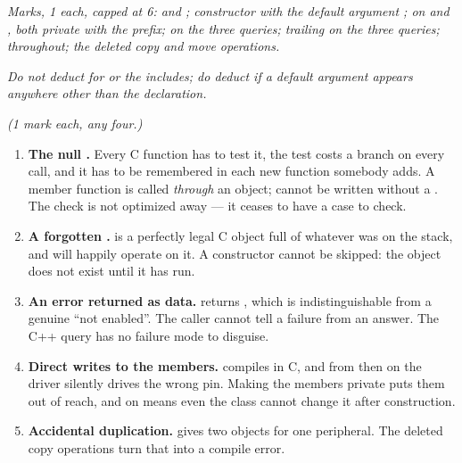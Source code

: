 {\itshape Marks, 1 each, capped at 6:  and ;
 constructor with the default argument ;  on 
and , both private with the  prefix; \code{[[nodiscard]]} on the three
queries; trailing  on the three queries;  throughout; the deleted copy
and move operations.\par}

\medskip
{\itshape Do not deduct for  or the includes; do deduct if a default argument
appears anywhere other than the declaration.\par}

{\itshape (1 mark each, any four.)\par}
\begin{enumerate}
  \item \textbf{The null .} Every C function has to test it, the test costs a branch on
    every call, and it has to be remembered in each new function somebody adds. A member function is
    called \emph{through} an object;  cannot be written without a
    . The check is not optimized away --- it ceases to have a case to check.
  \item \textbf{A forgotten .}  is a perfectly legal C object
    full of whatever was on the stack, and  will happily
    operate on it. A constructor cannot be skipped: the object does not exist until it has run.
  \item \textbf{An error returned as data.}  returns , which
    is indistinguishable from a genuine ``not enabled''. The caller cannot tell a failure from an
    answer. The C++ query has no failure mode to disguise.
  \item \textbf{Direct writes to the members.}  compiles in C, and from
    then on the driver silently drives the wrong pin. Making the members private puts them out of
    reach, and  on  means even the class cannot change it after
    construction.
  \item \textbf{Accidental duplication.}  gives two objects for one
    peripheral. The deleted copy operations turn that into a compile error.
\end{enumerate}

